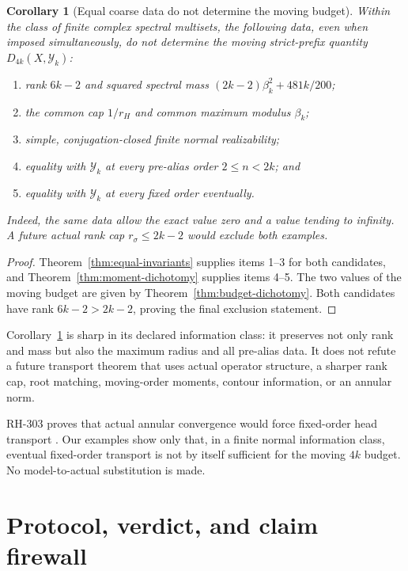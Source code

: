 \documentclass[11pt]{article}
\newtheorem{corollary}[theorem]{Corollary}
\theoremstyle{remark}
\newcommand{\cY}{\mathcal Y}
\begin{document}
\begin{corollary}[Equal coarse data do not determine the moving budget]
\label{cor:underdetermination}
Within the class of finite complex spectral multisets, the following data,
even when imposed simultaneously, do not determine the moving strict-prefix
quantity $D_{4k}(X,\cY_k)$:
\begin{enumerate}
\item rank $6k-2$ and squared spectral mass
$(2k-2)\beta_k^2+481k/200$;
\item the common cap $1/r_H$ and common maximum modulus $\beta_k$;
\item simple, conjugation-closed finite normal realizability;
\item equality with $\cY_k$ at every pre-alias order $2\le n<2k$; and
\item equality with $\cY_k$ at every fixed order eventually.
\end{enumerate}
Indeed, the same data allow the exact value zero and a value tending to
infinity.  A future actual rank cap $r_\sigma\le2k-2$ would exclude both
examples.
\end{corollary}

\begin{proof}
Theorem~\ref{thm:equal-invariants} supplies items 1--3 for both candidates,
and Theorem~\ref{thm:moment-dichotomy} supplies items 4--5.  The two values
of the moving budget are given by Theorem~\ref{thm:budget-dichotomy}.  Both
candidates have rank $6k-2>2k-2$, proving the final exclusion statement.
\end{proof}

Corollary~\ref{cor:underdetermination} is sharp in its declared information
class: it preserves not only rank and mass but also the maximum radius and
all pre-alias data.  It does not refute a future transport theorem that uses
actual operator structure, a sharper rank cap, root matching, moving-order
moments, contour information, or an annular norm.

RH-303 proves that actual annular convergence would force fixed-order head
transport \citep{WangFixedOrderNecessity2026}.  Our examples show only that,
in a finite normal information class, eventual fixed-order transport is not
by itself sufficient for the moving $4k$ budget.  No model-to-actual
substitution is made.

\section{Protocol, verdict, and claim firewall}
\end{document}
